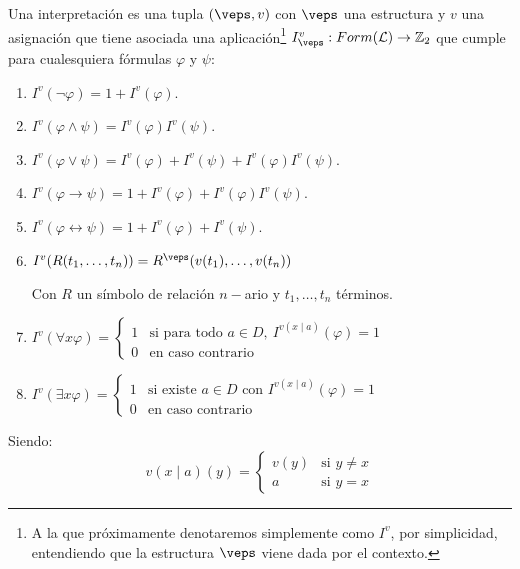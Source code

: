 \begin{definicion}[Interpretación]
    Una interpretación es una tupla $(\veps,v)$ con $\veps$ una estructura y $v$ una asignación que tiene asociada una aplicación\footnote{A la que próximamente denotaremos simplemente como $I^v$, por simplicidad, entendiendo que la estructura $\veps$ viene dada por el contexto.} $I_\veps^v:Form(\mathcal{L})\to\mathbb{Z}_2$ que cumple para cualesquiera fórmulas $\varphi$ y $\psi$:
    \begin{enumerate}
        \item $I^v(\lnot \varphi) = 1+ I^v(\varphi)$.
        \item $I^v(\varphi\land \psi) = I^v(\varphi)I^v(\psi)$.
        \item $I^v(\varphi\lor \psi) = I^v(\varphi) + I^v(\psi) + I^v(\varphi)I^v(\psi)$.
        \item $I^v(\varphi\to \psi) = 1 + I^v(\varphi) + I^v(\varphi)I^v(\psi)$.
        \item $I^v(\varphi\leftrightarrow \psi) = 1 + I^v(\varphi) + I^v(\psi)$.
        \item $I^v(R(t_1,\ldots,t_n)) = R^{\veps}(v(t_1), \ldots, v(t_n))$

            Con $R$ un símbolo de relación $n-$ario y $t_1,\ldots,t_n$ términos.
        \item $I^v(\forall x\varphi) = \left\{\begin{array}{ll}
                    1 & \text{si para todo\ } a\in D,\ I^{v(x\mid a)}(\varphi) = 1 \\
                    0 & \text{en caso contrario}
        \end{array}\right.$
        \item $I^v(\exists x\varphi) = \left\{\begin{array}{ll}
                    1 & \text{si existe\ } a\in D \text{\ con\ } I^{v(x\mid a)}(\varphi) = 1 \\
                    0 & \text{en caso contrario}
        \end{array}\right.$
    \end{enumerate}
    Siendo:
    \begin{equation*}
        v(x\mid a)(y) = \left\{\begin{array}{ll}
                v(y) & \text{si\ } y\neq x \\
                a & \text{si\ } y=x
        \end{array}\right.
    \end{equation*}
\end{definicion}

